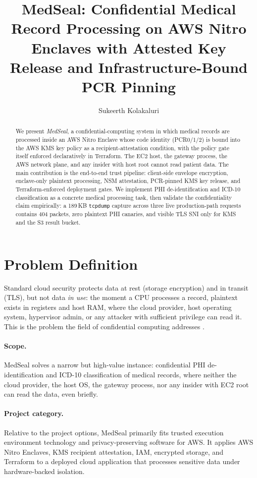 \documentclass[11pt]{article}
\title{MedSeal: Confidential Medical Record Processing on AWS Nitro Enclaves with Attested Key Release and Infrastructure-Bound PCR Pinning}
\author{Sukeerth Kolakaluri}
\begin{document}
\maketitle

\begin{abstract}
We present \emph{MedSeal}, a confidential-computing system in which
medical records are processed inside an AWS Nitro Enclave whose code
identity (PCR0/1/2) is bound into the AWS KMS key policy as a
recipient-attestation condition, with the policy gate itself enforced
declaratively in Terraform. The EC2 host, the gateway process, the
AWS network plane, and any insider with host root cannot read patient
data. The main contribution is the end-to-end trust pipeline:
client-side envelope encryption, enclave-only plaintext processing,
NSM attestation, PCR-pinned KMS key release, and Terraform-enforced
deployment gates. We implement PHI de-identification and ICD-10
classification as a concrete medical processing task, then validate
the confidentiality claim empirically: a 189\,KB \texttt{tcpdump}
capture across three live production-path requests contains 404
packets, zero plaintext PHI canaries, and visible TLS SNI only for KMS
and the S3 result bucket.
\end{abstract}

\section{Problem Definition}

Standard cloud security protects data at rest (storage encryption)
and in transit (TLS), but not data \emph{in use}: the moment a CPU
processes a record, plaintext exists in registers and host RAM,
where the cloud provider, host operating system, hypervisor admin,
or any attacker with sufficient privilege can read it. This is the
problem the field of confidential computing addresses
\cite{cccsurvey,sgxexplained}.

\paragraph{Scope.} MedSeal solves a narrow but high-value instance:
confidential PHI de-identification \cite{hhsdeid} and ICD-10
classification \cite{icd10} of medical records, where neither the
cloud provider, the host OS, the gateway process, nor any insider
with EC2 root can read the data, even briefly.

\paragraph{Project category.} Relative to the project options,
MedSeal primarily fits trusted execution environment technology and
privacy-preserving software for AWS. It applies AWS Nitro Enclaves,
KMS recipient attestation, IAM, encrypted storage, and Terraform to a
deployed cloud application that processes sensitive data under
hardware-backed isolation.
\end{document}
